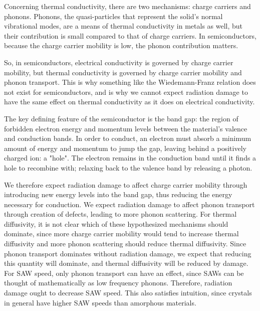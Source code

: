 Concerning thermal conductivity, there are two mechanisms: charge carriers and phonons. Phonons, the quasi-particles that represent the solid's normal vibrational modes, are a means of thermal conductivity in metals as well, but their contribution is small compared to that of charge carriers. In semiconductors, because the charge carrier mobility is low, the phonon contribution matters.

So, in semiconductors, electrical conductivity is governed by charge carrier mobility, but thermal conductivity is governed by charge carrier mobility and phonon transport. This is why something like the Wiedemann-Franz relation does not exist for semiconductors, and is why we cannot expect radiation damage to have the same effect on thermal conductivity as it does on electrical conductivity.
% 

The key defining feature of the semiconductor is the band gap: the region of forbidden electron energy and momentum levels between the material's valence and conduction bands. In order to conduct, an electron must absorb a minimum amount of energy and momentum to jump the gap, leaving behind a positively charged ion: a "hole". The electron remains in the conduction band until it finds a hole to recombine with; relaxing back to the valence band by releasing a photon.

We therefore expect radiation damage to affect charge carrier mobility through introducing new energy levels into the band gap, thus reducing the energy necessary for conduction. We expect radiation damage to affect phonon transport through creation of defects, leading to more phonon scattering. For thermal diffusivity, it is not clear which of these hypothesized mechanisms should dominate, since more charge carrier mobility would tend to increase thermal diffusivity and more phonon scattering should reduce thermal diffusivity. Since phonon transport dominates without radiation damage, we expect that reducing this quantity will dominate, and thermal diffusivity will be reduced by damage. For SAW speed, only phonon transport can have an effect, since SAWs can be thought of mathematically as low frequency phonons. Therefore, radiation damage ought to decrease SAW speed. This also satisfies intuition, since crystals in general have higher SAW speeds than amorphous materials.

